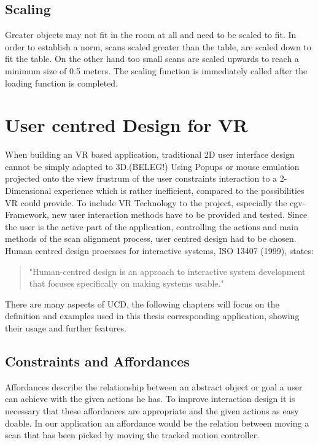 \documentclass[hyperref,english,bachelorofscience,bibnum]{cgvpub}
\begin{document}
\subsection{Scaling}

Greater objects may not fit in the room at all and need to be scaled to fit. In order to establish a norm, scans scaled greater than the table, are scaled down to fit the table. On the other hand too small scans are scaled upwards to reach a minimum size of 0.5 meters. The scaling function is immediately called after the loading function is completed.

\section{User centred Design for VR}

When building an VR based application, traditional 2D user interface design cannot be simply adapted to 3D.(BELEG!)
Using Popups or mouse emulation projected onto the view frustrum of the user constraints interaction to a 2-Dimensional experience which is rather inefficient, compared to the possibilities VR could provide.
To include VR Technology to the project, especially the cgv-Framework, new user interaction methods have to be provided and tested. Since the user is the active part of the application, controlling the actions and main methods of the scan alignment process, user centred design had to be chosen. 
Human centred design processes for interactive systems, ISO 13407 (1999), states: 
\begin{quote}
"Human-centred design is an approach to interactive system development that focuses specifically on making systems usable."
\end{quote}
There are many aspects of UCD, the following chapters will focus on the definition and examples used in this thesis corresponding application, showing their usage and further features.

\subsection{Constraints and Affordances}

Affordances describe the relationship between an abstract object or goal a user can achieve with the given actions he has\cite{Jerald2015}.
To improve interaction design it is necessary that these affordances are appropriate and the given actions as easy doable\cite{Jerald2015}.
In our application an affordance would be the relation between moving a scan that has been picked by moving the tracked motion controller. 
\end{document}
